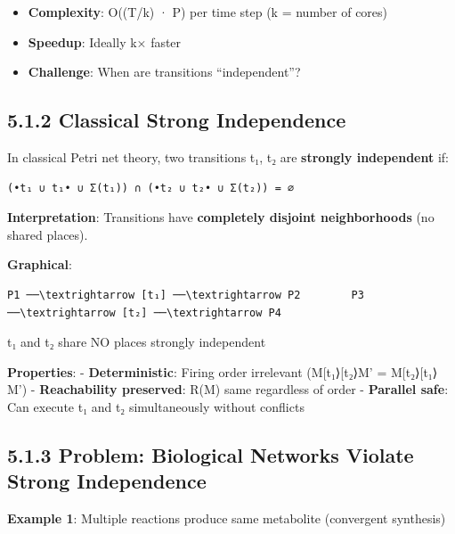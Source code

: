 \begin{itemize}
\tightlist
\item
  \textbf{Complexity}: O((\textbar T\textbar/k) · \textbar P\textbar)
  per time step (k = number of cores)
\item
  \textbf{Speedup}: Ideally k× faster
\item
  \textbf{Challenge}: When are transitions ``independent''?
\end{itemize}

\hypertarget{classical-strong-independence}{%
\subsection{5.1.2 Classical Strong
Independence}\label{classical-strong-independence}}

In classical Petri net theory, two transitions t₁, t₂ are
\textbf{strongly independent} if:

\begin{lstlisting}
(•t₁ ∪ t₁• ∪ Σ(t₁)) ∩ (•t₂ ∪ t₂• ∪ Σ(t₂)) = ∅
\end{lstlisting}

\textbf{Interpretation}: Transitions have \textbf{completely disjoint
neighborhoods} (no shared places).

\textbf{Graphical}:

\begin{lstlisting}
P1 ──\textrightarrow [t₁] ──\textrightarrow P2        P3 ──\textrightarrow [t₂] ──\textrightarrow P4
\end{lstlisting}

t₁ and t₂ share NO places \textrightarrow strongly independent

\textbf{Properties}: - \checkmark \textbf{Deterministic}: Firing order
irrelevant (M{[}t₁⟩{[}t₂⟩M' = M{[}t₂⟩{[}t₁⟩M') - \checkmark \textbf{Reachability
preserved}: R(M) same regardless of order - \checkmark \textbf{Parallel safe}:
Can execute t₁ and t₂ simultaneously without conflicts

\hypertarget{problem-biological-networks-violate-strong-independence}{%
\subsection{5.1.3 Problem: Biological Networks Violate Strong
Independence}\label{problem-biological-networks-violate-strong-independence}}

\textbf{Example 1}: Multiple reactions produce same metabolite
(convergent synthesis)

